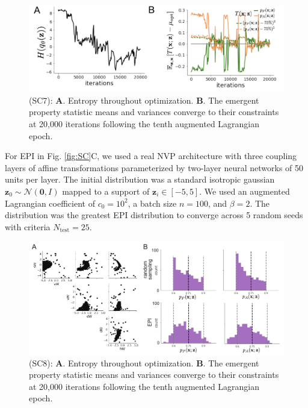 \documentclass[11pt]{article}
\begin{document}
\begin{figure}
\begin{center}
\includegraphics[scale=0.5]{figures/figSC7/figSC7.pdf}
\end{center}
\caption{\small (SC7): 
\textbf{A}. Entropy throughout optimization. 
\textbf{B}. The emergent property statistic means and variances converge to their constraints at 20,000 iterations following the tenth augmented Lagrangian epoch.
}
\label{fig:SC7}
\end{figure}

For EPI in Fig. \ref{fig:SC}C, we used a real NVP architecture with three coupling layers of affine transformations parameterized by two-layer neural networks of 50 units per layer.
The initial distribution was a standard isotropic gaussian $\mathbf{z}_0 \sim \mathcal{N}(\mathbf{0}, I)$ mapped to a support of $\mathbf{z}_i \in [-5, 5]$. 
We used an augmented Lagrangian coefficient of $c_0 = 10^{2}$, a batch size $n=100$, and $\beta=2$.
The distribution was the greatest EPI distribution to converge across 5 random seeds with criteria $N_{\text{test}} = 25$.

\begin{figure}
\begin{center}
\includegraphics[scale=0.8]{figures/figSC8/figSC8.pdf}
\end{center}
\caption{\small (SC8): 
\textbf{A}. Entropy throughout optimization. 
\textbf{B}. The emergent property statistic means and variances converge to their constraints at 20,000 iterations following the tenth augmented Lagrangian epoch.
}
\label{fig:SC8}
\end{figure}
\end{document}
